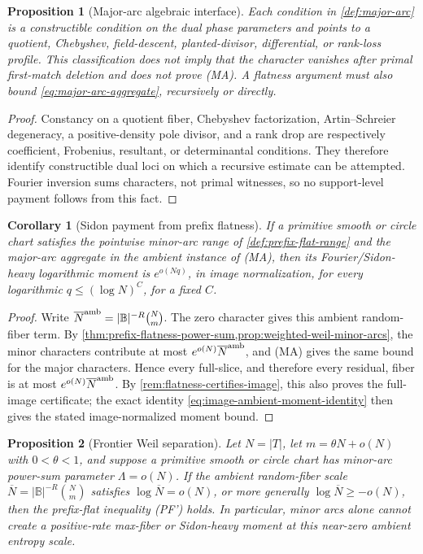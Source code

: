 \documentclass[12pt,a4paper]{amsart}
\numberwithin{equation}{section}
\newtheorem{proposition}[proposition]{Proposition}
\newtheorem{corollary}[corollary]{Corollary}
\theoremstyle{remark}
\newcommand{\B}{\mathbb B}
\newcommand{\barN}{\overline N}
\newcommand{\abs}[1]{\lvert #1\rvert}
\begin{document}
\begin{proposition}[Major-arc algebraic interface]\label{prop:major-arcs-are-cells}
Each condition in \cref{def:major-arc} is a constructible condition on the
dual phase parameters and points to a quotient, Chebyshev, field-descent,
planted-divisor, differential, or rank-loss profile.  This classification
does not imply that the character vanishes after primal first-match
deletion and does not prove \textup{(MA)}.  A flatness argument must also
bound \eqref{eq:major-arc-aggregate}, recursively or directly.
\end{proposition}

\begin{proof}
Constancy on a quotient fiber, Chebyshev factorization,
Artin--Schreier degeneracy, a positive-density pole divisor, and a rank
drop are respectively coefficient, Frobenius, resultant, or determinantal
conditions.  They therefore identify constructible dual loci on which a
recursive estimate can be attempted.  Fourier inversion sums characters,
not primal witnesses, so no support-level payment follows from this fact.
\end{proof}

\begin{corollary}[Sidon payment from prefix flatness]\label{cor:sidon-payment-from-prefix-flatness}
If a primitive smooth or circle chart satisfies the pointwise minor-arc
range of \cref{def:prefix-flat-range} and the major-arc aggregate
in the ambient instance of \textup{(MA)}, then its Fourier/Sidon-heavy logarithmic moment is
\(e^{o(Nq)}\), in image normalization, for every logarithmic
\(q\le(\log N)^C\), for a fixed \(C\).
\end{corollary}

\begin{proof}
Write \(\barN^{\rm amb}=\abs\B^{-R}\binom Nm\).  The zero character gives
this ambient random-fiber term.  By
\cref{thm:prefix-flatness-power-sum,prop:weighted-weil-minor-arcs}, the
minor characters contribute at most \(e^{o(N)}\barN^{\rm amb}\), and
\textup{(MA)} gives the same bound for the major characters.  Hence every
full-slice, and therefore every residual, fiber is at most
\(e^{o(N)}\barN^{\rm amb}\).  By
\cref{rem:flatness-certifies-image}, this also proves the full-image
certificate; the exact identity
\eqref{eq:image-ambient-moment-identity} then gives the stated
image-normalized moment bound.
\end{proof}

\begin{proposition}[Frontier Weil separation]\label{prop:frontier-weil-separation}
Let \(N=\abs T\), let \(m=\theta N+o(N)\) with \(0<\theta<1\), and suppose a primitive smooth or circle chart has minor-arc power-sum parameter \(\Lambda=o(N)\).  If the ambient random-fiber scale \(\barN=\abs\B^{-R}\binom Nm\) satisfies \(\log\barN=o(N)\), or more generally \(\log\barN\ge -o(N)\), then the prefix-flat inequality \textup{(PF')} holds.  In particular, minor arcs alone cannot create a positive-rate max-fiber or Sidon-heavy moment at this near-zero ambient entropy scale.
\end{proposition}
\end{document}
